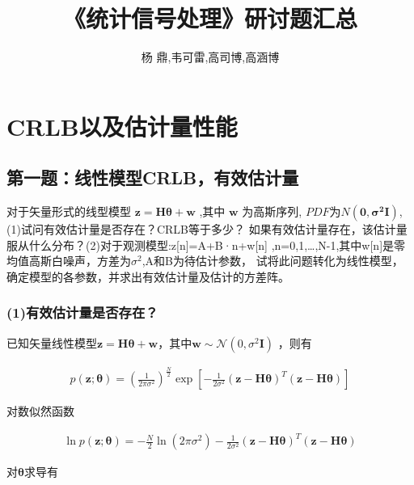 \documentclass[fontset=windows]{article}
\title{\heiti\zihao{2} 《统计信号处理》研讨题汇总}
\author{杨 鼎,韦可雷,高司博,高涵博}
\date{}
\numberwithin{figure}{section}
\begin{document}
\maketitle
\thispagestyle{empty}


\tableofcontents
\setcounter{page}{0}
\newpage

\section{CRLB以及估计量性能}
\subsection{第一题：线性模型CRLB，有效估计量}
对于矢量形式的线型模型 \(\mathbf{z=H}\boldsymbol{\theta}+\mathbf{w}\) ,其中 \(\mathbf{w}\) 为高斯序列,
\(PDF\)为\(N(\mathbf{0,\sigma^2I})\),(1)试问有效估计量是否存在？CRLB等于多少？
如果有效估计量存在，该估计量服从什么分布？(2)对于观测模型:z[n]=A+B·n+w[n]
,n=0,1,…,N-1,其中w[n]是零均值高斯白噪声，方差为\(\sigma^2\),A和B为待估计参数，
试将此问题转化为线性模型，确定模型的各参数，并求出有效估计量及估计的方差阵。

\subsubsection*{(1)有效估计量是否存在？}

已知矢量线性模型\(\mathbf{z=H}\boldsymbol{\theta}+\mathbf{w}\)，其中\(\mathbf{w}\sim \mathcal{N} (0,\sigma^2 \mathbf{I})\)
，则有

\begin{align*}
	p(\mathbf{z};\boldsymbol{\theta})=(\frac{1}{2\pi \sigma^2})^{\frac{N}{2}}
	\exp\left[-\frac{1}{2\sigma^2}(\mathbf{z-H\boldsymbol{\theta}})^T
		(\mathbf{z-H\boldsymbol{\theta}})\right]
\end{align*}

对数似然函数

\begin{align*}
	\ln p(\mathbf{z};\boldsymbol{\theta})=-{\frac{N}{2}}\ln (2\pi \sigma^2)
	-\frac{1}{2\sigma^2}(\mathbf{z-H}\boldsymbol{\theta})^T(\mathbf{z-H}\boldsymbol{\theta})
\end{align*}

对\(\boldsymbol{\theta}\)求导有
\end{document}

